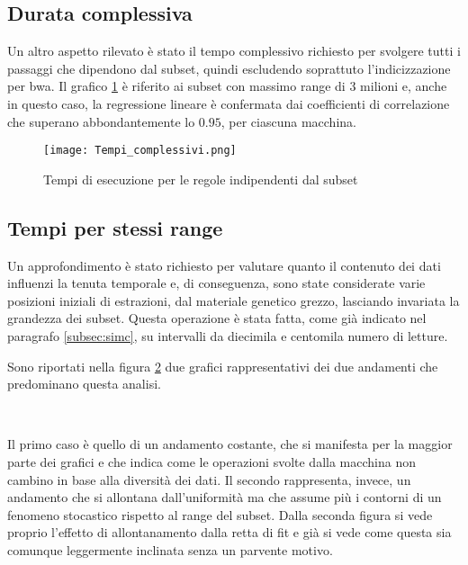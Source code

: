 \subsection{Durata complessiva}
Un altro aspetto rilevato è stato il tempo complessivo richiesto per svolgere tutti i passaggi che dipendono dal subset, quindi escludendo soprattuto l'indicizzazione per bwa.
Il grafico \ref{fig:Ttot} è riferito ai subset con massimo range di 3 milioni e, anche in questo caso, la regressione lineare è confermata dai coefficienti di correlazione che superano abbondantemente lo $0.95$, per ciascuna macchina.
\begin{figure}[H]
\centering
\texttt{[image: Tempi\_complessivi.png]}
\caption{Tempi di esecuzione per le regole indipendenti dal subset}
\label{fig:Ttot}
\end{figure}

\subsection{Tempi per stessi range}
Un approfondimento è stato richiesto per valutare quanto il contenuto dei dati influenzi la tenuta temporale e, di conseguenza, sono state considerate varie posizioni iniziali di estrazioni, dal materiale genetico grezzo, lasciando invariata la grandezza dei subset.
Questa operazione è stata fatta, come già indicato nel paragrafo \ref{subsec:simc}, su intervalli da diecimila e centomila numero di letture.

Sono riportati nella figura \ref{fig:Trng} due grafici rappresentativi dei due andamenti che predominano questa analisi.
\begin{figure}[H]
\centering
{} \quad
{} \\
\caption{}
\label{fig:Trng}
\end{figure}

Il primo caso è quello di un andamento costante, che si manifesta per la maggior parte dei grafici e che indica come le operazioni svolte dalla macchina non cambino in base alla diversità dei dati.
Il secondo rappresenta, invece, un andamento che si allontana dall'uniformità ma che assume più i contorni di un fenomeno stocastico rispetto al range del subset.
Dalla seconda figura si vede proprio l'effetto di allontanamento dalla retta di fit e già si vede come questa sia comunque leggermente inclinata senza un parvente motivo.

